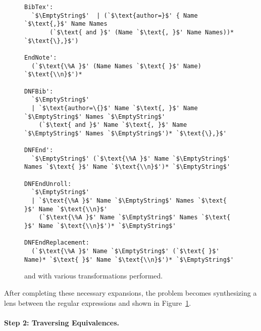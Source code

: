 \documentclass[numbers,10pt,preprint\ifanon ,nocopyrightspace\fi]{sigplanconf}
\begin{document}
\begin{figure}
\begin{lstlisting}[mathescape=true,columns=fixed]
BibTex':
  `$\EmptyString$'  | (`$\text{author=}$' { Name `$\text{,}$' Name Names
       (`$\text{ and }$' (Name `$\text{, }$' Name Names))* `$\text{\},}$')

EndNote':
  (`$\text{\%A }$' (Name Names `$\text{ }$' Name) `$\text{\\n}$')*

DNFBib':
  `$\EmptyString$'
  | `$\text{author=\{}$' Name `$\text{, }$' Name `$\EmptyString$' Names `$\EmptyString$'
    (`$\text{ and }$' Name `$\text{, }$' Name `$\EmptyString$' Names `$\EmptyString$')* `$\text{\},}$'

DNFEnd':
  `$\EmptyString$' (`$\text{\%A }$' Name `$\EmptyString$' Names `$\text{ }$' Name `$\text{\\n}$')* `$\EmptyString$'

DNFEndUnroll:
  `$\EmptyString$'
  | `$\text{\%A }$' Name `$\EmptyString$' Names `$\text{ }$' Name `$\text{\\n}$'
    (`$\text{\%A }$' Name `$\EmptyString$' Names `$\text{ }$' Name `$\text{\\n}$')* `$\EmptyString$'

DNFEndReplacement:
  (`$\text{\%A }$' Name `$\EmptyString$' (`$\text{ }$' Name)* `$\text{ }$' Name `$\text{\\n}$')* `$\EmptyString$'
\end{lstlisting}
  \label{fig:examples-expanded}
  \caption{
     and  with various transformations performed.
  }
\end{figure}
After completing these necessary expansions, the problem becomes synthesizing a
lens between the regular expressions  and  shown in
Figure~\ref{fig:examples-expanded}.

\paragraph*{Step 2:  Traversing Equivalences.}
\end{document}
